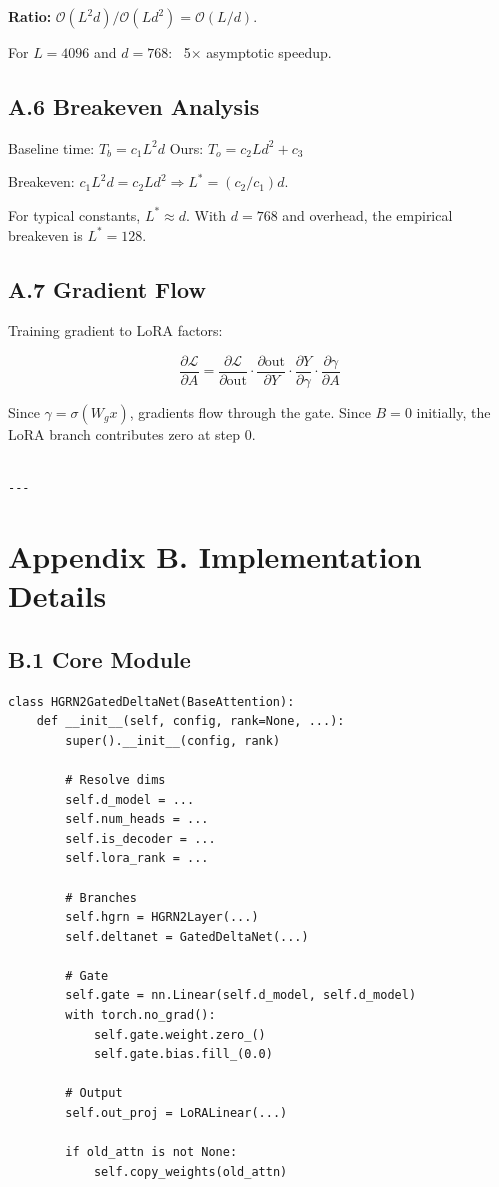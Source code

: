 \textbf{Ratio:} $\mathcal{O}(L^2 d) / \mathcal{O}(L d^2) = \mathcal{O}(L/d)$.

For $L = 4096$ and $d = 768$: ~5$\times$ asymptotic speedup.

\subsection{A.6 Breakeven Analysis}

Baseline time: $T_b = c_1 L^2 d$
Ours: $T_o = c_2 L d^2 + c_3$

Breakeven: $c_1 L^2 d = c_2 L d^2 \Rightarrow L^* = (c_2/c_1) d$.

For typical constants, $L^* \approx d$. With $d = 768$ and overhead, the 
empirical breakeven is $L^* = 128$.

\subsection{A.7 Gradient Flow}

Training gradient to LoRA factors:

\[
\frac{\partial \mathcal{L}}{\partial A} = \frac{\partial \mathcal{L}}{\partial \text{out}} \cdot \frac{\partial \text{out}}{\partial Y} \cdot \frac{\partial Y}{\partial \gamma} \cdot \frac{\partial \gamma}{\partial A}
\tag{A.8}
\]

Since $\gamma = \sigma(W_g x)$, gradients flow through the gate. Since 
$B = 0$ initially, the LoRA branch contributes zero at step 0.
\begin{lstlisting}

---
\end{lstlisting}

\section{Appendix B. Implementation Details}

\subsection{B.1 Core Module}

\begin{lstlisting}
class HGRN2GatedDeltaNet(BaseAttention):
    def __init__(self, config, rank=None, ...):
        super().__init__(config, rank)
        
        # Resolve dims
        self.d_model = ...
        self.num_heads = ...
        self.is_decoder = ...
        self.lora_rank = ...
        
        # Branches
        self.hgrn = HGRN2Layer(...)
        self.deltanet = GatedDeltaNet(...)
        
        # Gate
        self.gate = nn.Linear(self.d_model, self.d_model)
        with torch.no_grad():
            self.gate.weight.zero_()
            self.gate.bias.fill_(0.0)
        
        # Output
        self.out_proj = LoRALinear(...)
        
        if old_attn is not None:
            self.copy_weights(old_attn)
\end{lstlisting}

